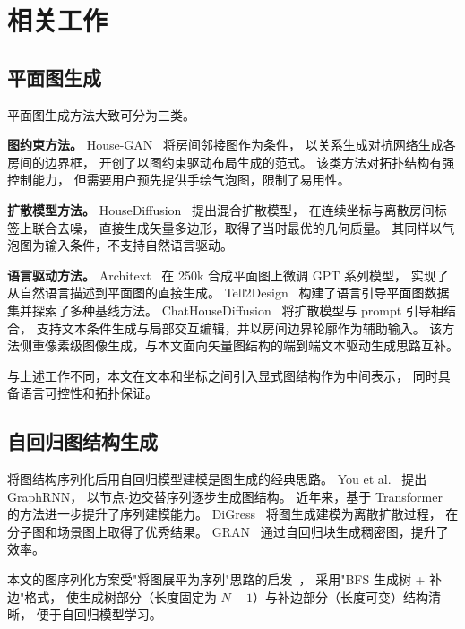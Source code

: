 \section{相关工作}
\label{sec:related_work}

\subsection{平面图生成}
\label{subsec:floorplan_gen}

平面图生成方法大致可分为三类。

\textbf{图约束方法。}
House-GAN~\cite{nauata2020housegan} 将房间邻接图作为条件，
以关系生成对抗网络生成各房间的边界框，
开创了以图约束驱动布局生成的范式。
该类方法对拓扑结构有强控制能力，
但需要用户预先提供手绘气泡图，限制了易用性。

\textbf{扩散模型方法。}
HouseDiffusion~\cite{shabani2023housediffusion} 提出混合扩散模型，
在连续坐标与离散房间标签上联合去噪，
直接生成矢量多边形，取得了当时最优的几何质量。
其同样以气泡图为输入条件，不支持自然语言驱动。

\textbf{语言驱动方法。}
Architext~\cite{galanos2023architext} 在 250k 合成平面图上微调 GPT 系列模型，
实现了从自然语言描述到平面图的直接生成。
Tell2Design~\cite{leng2023tell2design} 构建了语言引导平面图数据集并探索了多种基线方法。
ChatHouseDiffusion~\cite{qin2025chathousediffusion} 将扩散模型与 prompt 引导相结合，
支持文本条件生成与局部交互编辑，并以房间边界轮廓作为辅助输入。
该方法侧重像素级图像生成，与本文面向矢量图结构的端到端文本驱动生成思路互补。

与上述工作不同，本文在文本和坐标之间引入显式图结构作为中间表示，
同时具备语言可控性和拓扑保证。

\subsection{自回归图结构生成}
\label{subsec:autoregressive_graph}

将图结构序列化后用自回归模型建模是图生成的经典思路。
You et al.~\cite{you2018graphrnn} 提出 GraphRNN，
以节点-边交替序列逐步生成图结构。
近年来，基于 Transformer 的方法进一步提升了序列建模能力。
DiGress~\cite{vignac2022digress} 将图生成建模为离散扩散过程，
在分子图和场景图上取得了优秀结果。
GRAN~\cite{liao2019gran} 通过自回归块生成稠密图，提升了效率。

本文的图序列化方案受"将图展平为序列"思路的启发~\cite{you2018graphrnn}，
采用"BFS 生成树 + 补边"格式，
使生成树部分（长度固定为 $N-1$）与补边部分（长度可变）结构清晰，
便于自回归模型学习。

